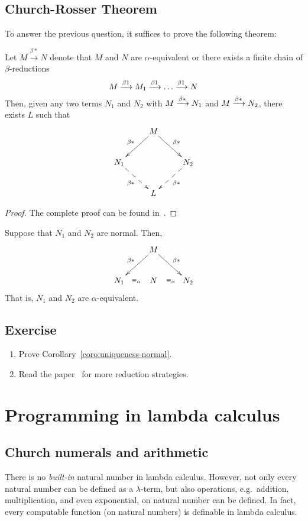\subsection{Church-Rosser Theorem}
To answer the previous question, it suffices to prove the following theorem:
\begin{theorem}
  Let $M \xrightarrow{\beta*} N$ denote that $M$ and $N$ are $\alpha$-equivalent
  or there exists a finite chain of $\beta$-reductions
  \[
    M \xrightarrow{\beta1} M_1 \xrightarrow{\beta1} \dots \xrightarrow{\beta1} N
  \]
  Then, given any two terms $N_1$ and $N_2$ with
  $M \xrightarrow{\beta*} N_1$ and $M\xrightarrow{\beta*} N_2$, there exists $L$ such that
  \[
    \xymatrix{
      & M \ar[rd]^{\beta*} \ar[ld]_{\beta*} \\
      N_1 \ar@{-->}[rd]_{\beta*} & & N_2 \ar@{-->}[ld]^{\beta*} \\
      & L
    }
  \]
\end{theorem}
\begin{proof}
  The complete proof can be found in~\cite[Chapter 4]{Barendregt1984}.
\end{proof}
\begin{corollary}\label{coro:uniqueness-normal}
  Suppose that $N_1$ and $N_2$ are normal. Then, 
  \[
    \xymatrix{
      & M \ar[rd]^{\beta*} \ar[ld]_{\beta*} \\
      N_1 \ar@{}[r]|{\equiv_\alpha} & N & N_2 \ar@{}[l]|{\equiv_\alpha} \\
    }
  \]
  That is, $N_1$ and $N_2$ are $\alpha$-equivalent.
\end{corollary}
\subsection*{Exercise}
\begin{enumerate}
  \item Prove Corollary~\ref{coro:uniqueness-normal}.
  \item Read the paper~\cite[Section 7]{Sestoft2002} for more reduction
    strategies.
\end{enumerate}
\section{Programming in lambda calculus}
\subsection{Church numerals and arithmetic}
There is no \emph{built-in} natural number in lambda calculus. However, 
not only every natural number can be defined as a $\lambda$-term, but also 
operations, e.g.\ addition, multiplication, and even exponential, on natural
number can be defined. In fact, every computable function (on natural numbers)
is definable in lambda calculus. 

